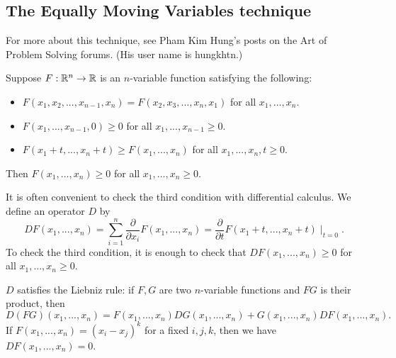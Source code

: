\begin{enumerate}
\begin{comment}
\item (Vasc) Prove that if $f$ is differentiable and $f'$ is convex, then for any $x\ge y\ge z$ we have
\[
f(2x+y)+f(2y+z)+f(2z+x) \ge f(2x+z) + f(2z+y) + f(2y+x).
\]

\item Popoviciu defines the divided differences of a polynomial inductively, as follows:
\begin{align*}
[a;f] =&\ f(a),\\
[a,b;f] =&\ \frac{f(b)-f(a)}{b-a},\\
[a_0,...,a_n;f] =&\ \frac{[a_1,...,a_n;f]-[a_0, ..., a_{n-1};f]}{a_n-a_0}.
\end{align*}
Prove, by induction on $n$, that if the $n$th derivative of $f$ exists and is nonnegative, that for any $a_0, ..., a_n$ we have
\[
[a_0, ..., a_n;f]\ge 0.
\]
\end{comment}
\end{enumerate}

\subsection{The Equally Moving Variables technique}

For more about this technique, see Pham Kim Hung's posts on the Art of Problem Solving forums. (His user name is hungkhtn.)

\begin{thm} Suppose $F:\mathbb{R}^n\rightarrow\mathbb{R}$ is an $n$-variable function satisfying the following:
\begin{itemize}
\item $F(x_1, x_2, ..., x_{n-1}, x_n) = F(x_2, x_3, ..., x_n, x_1)$ for all $x_1, ..., x_n$.
\item $F(x_1, ..., x_{n-1}, 0) \ge 0$ for all $x_1, ..., x_{n-1}\ge 0$.
\item $F(x_1+t, ..., x_n+t) \ge F(x_1, ..., x_n)$ for all $x_1, ..., x_n, t\ge 0$.
\end{itemize}
Then $F(x_1, ..., x_n) \ge 0$ for all $x_1, ..., x_n \ge 0$.
\end{thm}

It is often convenient to check the third condition with differential calculus. We define an operator $D$ by
\[
DF(x_1, ..., x_n) = \sum_{i=1}^n \frac{\partial}{\partial x_i}F(x_1, ..., x_n) = \frac{\partial}{\partial t}F(x_1+t, ..., x_n+t)\mid_{t=0}.
\]
To check the third condition, it is enough to check that $DF(x_1, ..., x_n)\ge 0$ for all $x_1, ..., x_n\ge 0$.

$D$ satisfies the Liebniz rule: if $F, G$ are two $n$-variable functions and $FG$ is their product, then
\[
D(FG)(x_1, ..., x_n) = F(x_1, ..., x_n)DG(x_1, ..., x_n) + G(x_1, ..., x_n)DF(x_1, ..., x_n).
\]
If $F(x_1,...,x_n) = (x_i-x_j)^k$ for a fixed $i,j,k$, then we have $DF(x_1, ..., x_n) = 0$.

